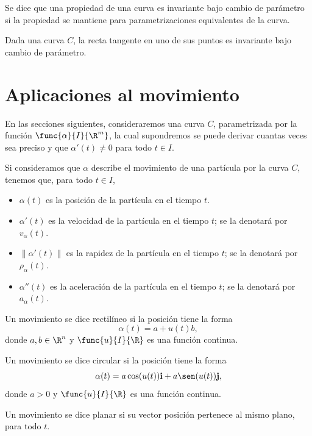 \documentclass[a4,11pt]{aleph-notas}
\begin{document}
\begin{advertencia}
    Se dice que una propiedad de una curva es invariante bajo cambio de parámetro si la propiedad se mantiene para parametrizaciones equivalentes de la curva.
\end{advertencia}

\begin{prop}
    Dada una curva $C$, la recta tangente en uno de sus puntos es invariante bajo cambio de parámetro.
\end{prop}

\section{Aplicaciones al movimiento}

En las secciones siguientes, consideraremos una curva $C$, parametrizada por la función $\func{\alpha}{I}{\R^m}$, la cual supondremos se puede derivar cuantas veces sea preciso y que $\alpha'(t)\neq 0$ para todo $t\in I$.

\begin{defi}
    Si consideramos que $\alpha$ describe el movimiento de una partícula por la curva $C$, tenemos que, para todo $t\in I$,
    \begin{itemize}
        \item $\alpha(t)$ es la posición de la partícula en el tiempo $t$.
        \item $\alpha'(t)$ es la velocidad de la partícula en el tiempo $t$; se la denotará por $v_\alpha(t)$.
        \item $\|\alpha'(t)\|$ es la rapidez de la partícula en el tiempo $t$; se la denotará por $\rho_\alpha(t)$.
        \item $\alpha''(t)$ es la aceleración de la partícula en el tiempo $t$; se la denotará por $a_\alpha(t)$.
    \end{itemize}
\end{defi}

\begin{defi}
    Un movimiento se dice rectilíneo si la posición tiene la forma
    \[
        \alpha(t)=a+u(t) b,
    \]
    donde $a,b\in\R^n$ y $\func{u}{I}{\R}$ es una función continua.
\end{defi}

\begin{defi}
    Un movimiento se dice circular si la posición tiene la forma
    \[
        \alpha(t)=a\cos(u(t))\mathbf{i}+a\sen(u(t))\mathbf{j},
    \]
    donde $a>0$ y $\func{u}{I}{\R}$ es una función continua.
\end{defi}

\begin{defi}
    Un movimiento se dice planar si su vector posición pertenece al mismo plano, para todo $t$.
\end{defi}
\end{document}
